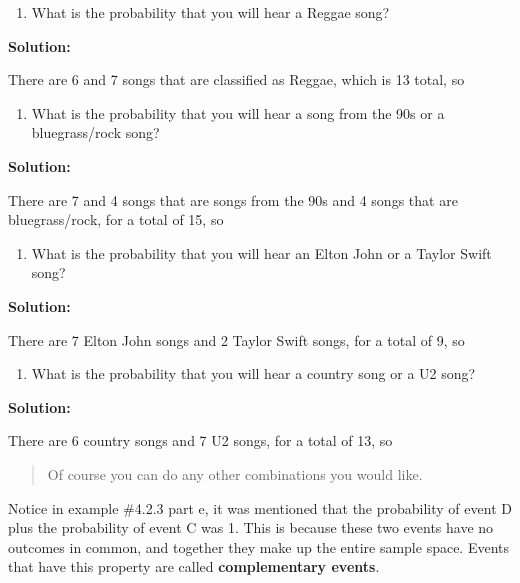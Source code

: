 \documentclass[]{book}
\providecommand{\tightlist}{%
  \setlength{\itemsep}{0pt}\setlength{\parskip}{0pt}}
\begin{document}
\begin{enumerate}
\def\labelenumi{\alph{enumi}.}
\setcounter{enumi}{3}
\tightlist
\item
  What is the probability that you will hear a Reggae song?
\end{enumerate}

\textbf{Solution:}

There are 6 and 7 songs that are classified as Reggae, which is 13
total, so

\begin{enumerate}
\def\labelenumi{\alph{enumi}.}
\setcounter{enumi}{4}
\tightlist
\item
  What is the probability that you will hear a song from the 90s or a
  bluegrass/rock song?
\end{enumerate}

\textbf{Solution:}

There are 7 and 4 songs that are songs from the 90s and 4 songs that
are bluegrass/rock, for a total of 15, so

\begin{enumerate}
\def\labelenumi{\alph{enumi}.}
\setcounter{enumi}{5}
\tightlist
\item
  What is the probability that you will hear an Elton John or a Taylor
  Swift song?
\end{enumerate}

\textbf{Solution:}

There are 7 Elton John songs and 2 Taylor Swift songs, for a total
of 9, so

\begin{enumerate}
\def\labelenumi{\alph{enumi}.}
\setcounter{enumi}{6}
\tightlist
\item
  What is the probability that you will hear a country song or a U2
  song?
\end{enumerate}

\textbf{Solution:}

There are 6 country songs and 7 U2 songs, for a total of 13, so

\begin{quote}
Of course you can do any other combinations you would like.
\end{quote}

Notice in example \#4.2.3 part e, it was mentioned that the probability
of event D plus the probability of event C was 1. This is because these
two events have no outcomes in common, and together they make up the
entire sample space. Events that have this property are called
\textbf{complementary events}.
\end{document}
